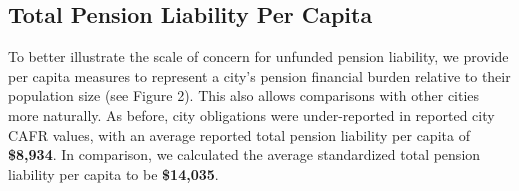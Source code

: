 \documentclass[12pt]{article}
\begin{document}
\begin{figure}
  \label{fig:key}
\end{figure}


\subsection{Total Pension Liability Per
Capita}

To better illustrate the scale of concern for unfunded pension
liability, we provide per capita measures to represent a city's pension
financial burden relative to their population size (see Figure 2). This also allows
comparisons with other cities more naturally. As before, city
obligations were under-reported in reported city CAFR values, with an average
reported total pension liability per capita of \textbf{\$8,934}. In comparison, we calculated the average standardized total pension liability per capita to be
\textbf{\$14,035}.

\begin{figure}
  \label{fig:key}
\end{figure}
\end{document}
